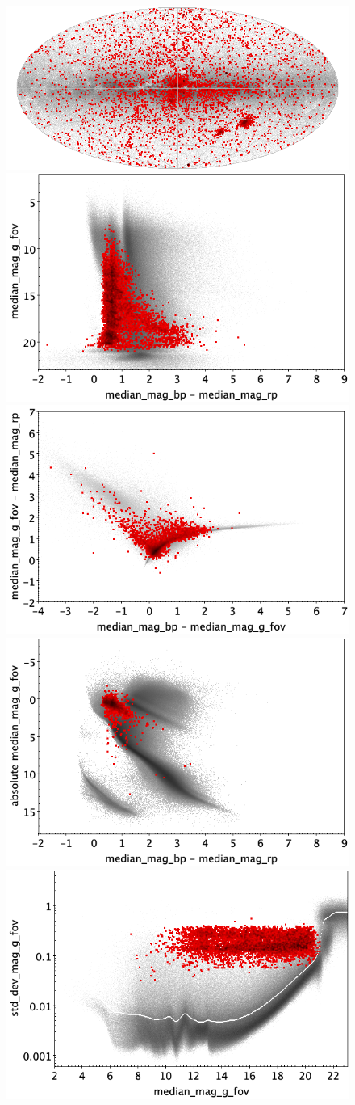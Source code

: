 \documentclass[longauth]{aa}
\begin{document}
\begin{appendix}
\begin{figure}
\centering
{} \includegraphics[width=0.6\hsize]{figures/appendix/RR_trn_sky.png} \\ %
\vspace{4mm}
 \includegraphics[width=0.45\hsize]{figures/appendix/RR_trn_cm.png}  %
\hspace{2mm}
 \includegraphics[width=0.45\hsize]{figures/appendix/RR_trn_cc.png} \\ %
\vspace{4mm}
 \includegraphics[width=0.45\hsize]{figures/appendix/RR_trn_cam.png}  %
\hspace{2mm}
 \includegraphics[width=0.45\hsize]{figures/appendix/RR_trn_msd.png} \\ %

\end{figure}
\end{appendix}
\end{document}
